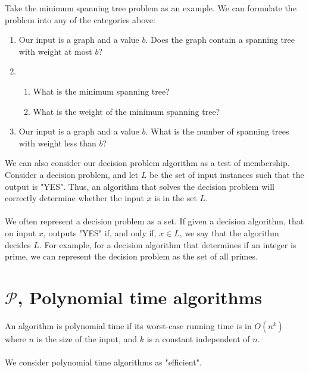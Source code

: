\documentclass[a4paper]{article}
\begin{document}
Take the minimum spanning tree problem as an example. We can formulate the problem into any of the categories above:
\begin{enumerate}
	\item Our input is a graph and a value $b$. Does the graph contain a spanning tree with weight at most $b$?
	\item 
	\begin{enumerate}
		\item What is the minimum spanning tree?
		\item What is the weight of the minimum spanning tree?
	\end{enumerate}
	\item Our input is a graph and a value $b$. What is the number of spanning trees with weight less than $b$?
\end{enumerate}
We can also consider our decision problem algorithm as a test of membership. Consider a decision problem, and let $L$ be the set of input instances such that the output is "YES". Thus, an algorithm that solves the decision problem will correctly determine whether the input $x$ is in the set $L$.\\\\
We often represent a decision problem as a set. If given a decision algorithm, that on input $x$, outputs "YES" if, and only if, $x\in L$, we say that the algorithm decides $L$. For example, for a decision algorithm that determines if an integer is prime, we can represent the decision problem as the set of all primes.

\section{$\mathcal{P}$, Polynomial time algorithms}
An algorithm is polynomial time if its worst-case running time is in $O(n^k)$ where $n$ is the size of the input, and $k$ is a constant independent of $n$.\\\\
We consider polynomial time algorithms as "efficient".
\end{document}
